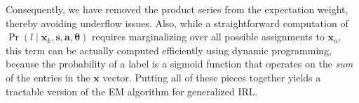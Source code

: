 \noindent
Consequently, we have removed the product series from the expectation
weight, thereby avoiding underflow issues. Also, while a
straightforward computation of
$\Pr(l \mid \bm{x}_k, \bm{s}, \bm{a}, \bm{\theta})$ requires
marginalizing over all possible assignments to $\bm{x}_u$, this term
can be actually computed efficiently using dynamic programming,
because the probability of a label is a sigmoid function that operates
on the \emph{sum\/} of the entries in the $\bm{x}$ vector.
%
Putting all of these pieces together yields a tractable version of the
EM algorithm for generalized IRL.

